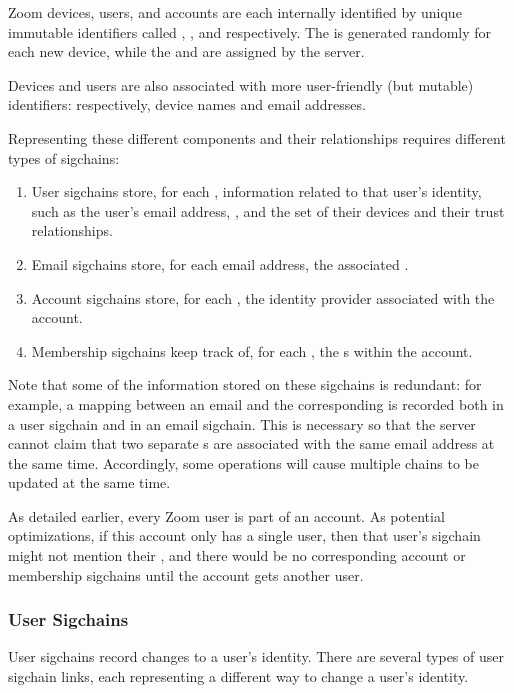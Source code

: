 Zoom devices, users, and accounts are each internally identified by unique immutable identifiers
called \deviceid, \userID, and \accountID respectively. The \deviceid is generated randomly for each
new device, while the \userID and \accountID are assigned by the server.

Devices and users are also associated with more user-friendly (but mutable) identifiers: respectively, device names and email addresses.

Representing these different components and their relationships requires different types of
sigchains:

\begin{enumerate}
\item User sigchains store, for each \userID, information related to that user's identity, such as
    the user's email address, \accountID, and the set of their devices and their trust
    relationships.
\item Email sigchains store, for each email address, the associated \userID.
\item Account sigchains store, for each \accountID, the identity provider associated
    with the account.
\item Membership sigchains keep track of, for each \accountID, the {\userID}s within the account.
\end{enumerate}

Note that some of the information stored on these sigchains is redundant: for example, a mapping
between an email and the corresponding \userID is recorded both in a user sigchain and in an email
sigchain. This is necessary so that the server cannot claim that two separate {\userID}s are
associated with the same email address at the same time. Accordingly, some operations will cause
multiple chains to be updated at the same time.

As detailed earlier, every Zoom user is part of an account. As potential optimizations, if this
account only has a single user, then that user's sigchain might not mention
their \accountID, and there would be no corresponding account or membership sigchains until the
account gets another user.

\subsubsection{User Sigchains}
 \label{subsubsec:usersigchains}
User sigchains record changes to a user's identity. There are several types of user sigchain links,
each representing a different way to change a user's identity.

